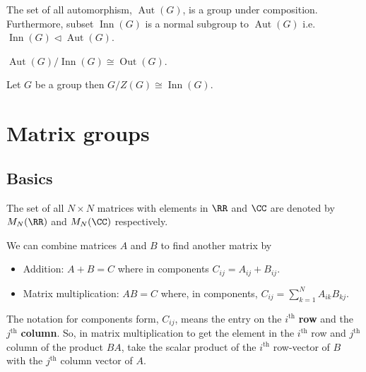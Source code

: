\documentclass[12pt, a4paper]{article}
\DeclareMathOperator{\aut}{Aut}
\DeclareMathOperator{\inn}{Inn}
\DeclareMathOperator{\out}{Out}
\begin{document}
\begin{mdthm}
    The set of all automorphism, \(\aut(G)\), is a group under composition. Furthermore, subset \(\inn(G)\) is a normal subgroup to \(\aut(G)\) i.e. \(\inn(G) \triangleleft \aut(G)\).
\end{mdthm}

\begin{mdremark}
    \(\aut(G) / \inn(G)\cong \out(G)\).
\end{mdremark}

\begin{mdthm}
    Let \(G\) be a group then \(G / Z(G) \cong \inn(G)\).
\end{mdthm}

\pagebreak

\section{Matrix groups}

\subsection{Basics}

\begin{definition}
    The set of all \(N\times N\) matrices with elements in \(\RR\) and \(\CC\) are denoted by \(M_N(\RR)\) and \(M_N(\CC)\) respectively.
\end{definition}

\begin{theorem}
    We can combine matrices \(A\) and \(B\) to find another matrix by
    \begin{itemize}
        \item Addition: \(A+B=C\) where in components \(C_{ij} =A_{ij}+B_{ij}\).
        \item Matrix multiplication: \(AB=C\) where, in components, \(C_{ij}=\sum_{k=1}^N A_{ik} B_{kj}\).
    \end{itemize}
\end{theorem}

\begin{mdnote}
    The notation for components form, \(C_{ij}\), means the entry on the \(i^{\text{th}}\) \textbf{row} and the \(j^{\text{th}}\) \textbf{column}. So, in matrix multiplication to get the element in the \(i^{\text{th}}\) row and \(j^{\text{th}}\) column of the product \(BA\), take the scalar product of the \(i^{\text{th}}\) row-vector of \(B\) with the \(j^{\text{th}}\) column vector of \(A\). 
\end{mdnote}
\end{document}
